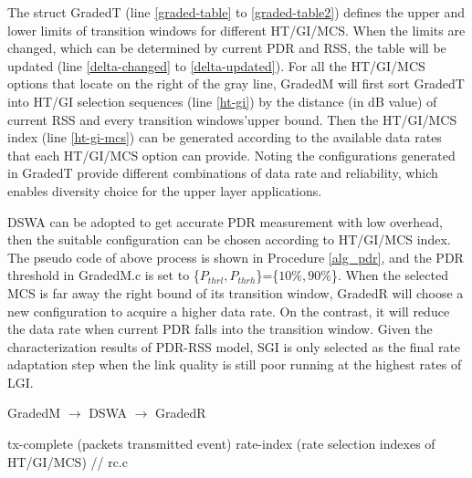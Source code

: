 \documentclass[draftclsnofoot,journal,onecolumn,11pt]{IEEEtran}
\begin{document}
The struct GradedT (line \ref{graded-table} to \ref{graded-table2}) defines the upper and lower limits of transition windows for different HT/GI/MCS. When the limits are changed, which can be determined by current PDR and RSS, the table will be updated (line \ref{delta-changed} to \ref{delta-updated}). For all the HT/GI/MCS options that locate on the right of the gray line, GradedM will first sort GradedT into HT/GI selection sequences (line \ref{ht-gi}) by the distance (in dB value) of current RSS and every transition windows\rq upper bound. Then the HT/GI/MCS index (line \ref{ht-gi-mcs}) can be generated according to the available data rates that each HT/GI/MCS option can provide. Noting the configurations generated in GradedT provide different combinations of data rate and reliability, which enables diversity choice for the upper layer applications.

DSWA can be adopted to get accurate PDR measurement with low overhead, then the suitable configuration can be chosen according to HT/GI/MCS index. The pseudo code of above process is shown in Procedure \ref{alg_pdr}, and the PDR threshold in GradedM.c is set to \{$P_{thrl},P_{thrh}$\}=\{$10\%,90\%$\}. When the selected MCS is far away the right bound of its transition window, GradedR will choose a new configuration to acquire a higher data rate. On the contrast, it will reduce the data rate when current PDR falls into the transition window. Given the characterization results of PDR-RSS model, SGI is only selected as the final rate adaptation step when the link quality is still poor running at the highest rates of LGI.
\begin{algorithm}[!htp]
\renewcommand{\algorithmicrequire}{\textbf{Input:}}
\renewcommand{\algorithmicensure}{\textbf{Output:}}
\caption{GradedM $\rightarrow$ DSWA $\rightarrow$ GradedR}
\label{alg_pdr}
\begin{algorithmic}[1]
\Require tx-complete (packets transmitted event)
\Ensure  rate-index (rate selection indexes of HT/GI/MCS)
 // rc.c
\EndIf
{}
\EndIf
\State {}
\end{algorithmic}
\end{algorithm}


\renewcommand\refname{References}
%


\end{document}
